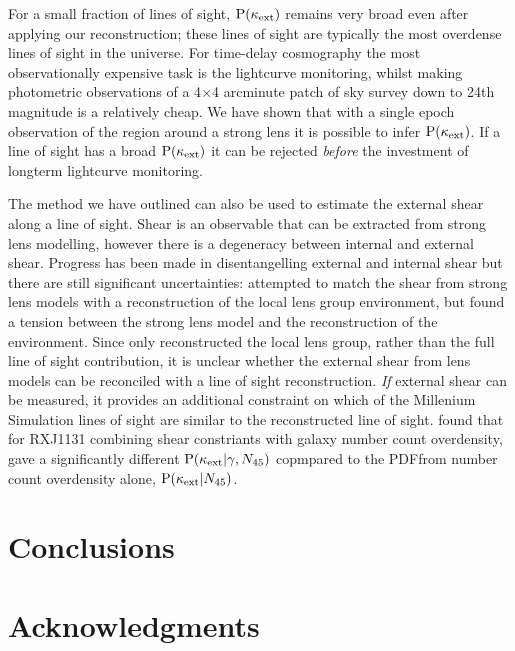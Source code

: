 \documentclass[useAMS,usenatbib]{mn2e}
\begin{document}
For a small fraction of lines of sight, ${\rm P}(\kappa_{\rm ext})$ remains very broad even after applying our reconstruction; these lines of sight are typically the most overdense lines of sight in the universe. For time-delay cosmography the most observationally expensive task is the lightcurve monitoring, whilst making photometric observations of a 4$\times$4 arcminute patch of sky survey down to 24th magnitude is a relatively cheap. We have shown that with a single epoch observation of the region around a strong lens it is possible to infer ${\rm P}(\kappa_{\rm ext})$. If a line of sight has a broad ${\rm P}(\kappa_{\rm ext})$ it can be rejected {\it before} the investment of longterm lightcurve monitoring.

The method we have outlined can also be used to estimate the external shear
along a line of sight. Shear is an observable that can be extracted from
strong lens modelling, however there is a degeneracy between internal and
external shear. Progress has been made in disentangelling external and
internal shear \citep[\eg][]{xxx} but there are still significant
uncertainties: \citet{WongEtal2011} attempted to match the shear from strong
lens models with a reconstruction of the local lens group environment, but
found a tension between the strong lens model and the reconstruction of the
environment. Since \citet{WongEtal2011} only reconstructed the local lens
group, rather than the full line of sight contribution, it is unclear whether
the external shear from lens models can be reconciled with a line of sight
reconstruction. {\it If} external shear can be measured, it provides an
additional constraint on which of the Millenium Simulation lines of sight are
similar to the reconstructed line of sight. \citet{SuyuEtal2012} found that
for RXJ1131 combining shear constriants with galaxy number count overdensity,
gave a significantly different ${\rm P}(\kappa_{\rm ext}|\gamma,N_{45})$ copmpared to the
PDFfrom number count overdensity alone, ${\rm P}(\kappa_{\rm ext}|N_{45})$. 



\section{Conclusions}
\label{sec:conclude}


\section*{Acknowledgments}
 
\end{document}
